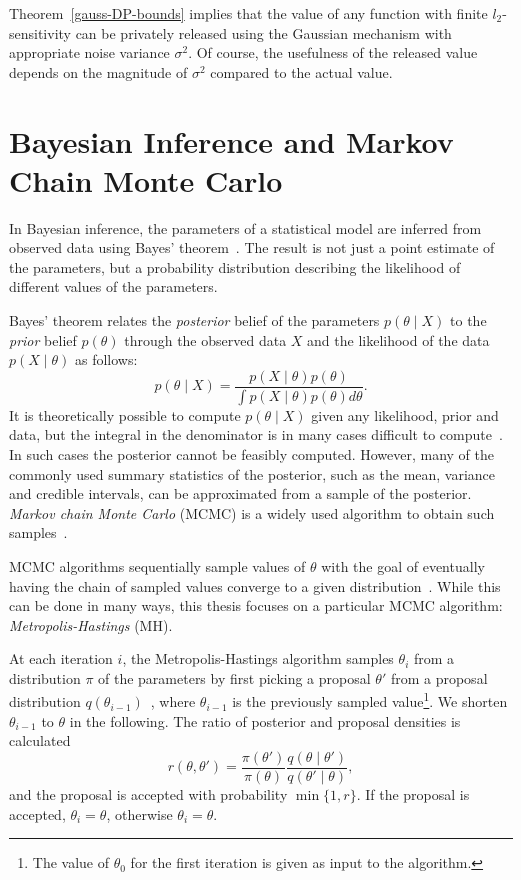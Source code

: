\documentclass[english,twoside,openright]{HYgraduMLDS}
\begin{document}
Theorem~\ref{gauss-DP-bounds} implies that the value of any function with
finite \(l_2\)-sensitivity can be privately released using the Gaussian mechanism 
with appropriate noise variance \(\sigma^2\). Of course, the usefulness of the 
released value depends on the magnitude of \(\sigma^2\) compared to the actual 
value.

\section{Bayesian Inference and Markov Chain Monte Carlo}\label{MCMC_background}

In Bayesian inference, the parameters of a statistical model are inferred from 
observed data using Bayes' theorem~\cite{BDA}. The result is not just a point estimate 
of the parameters, but a probability distribution describing the likelihood 
of different values of the parameters.

Bayes' theorem relates the \emph{posterior} belief of the parameters 
\(p(\theta \mid X)\) to the \emph{prior} belief \(p(\theta)\) through the 
observed data \(X\) and the likelihood of the data \(p(X\mid \theta)\) as follows:
\[
    p(\theta \mid X) = \frac{p(X \mid \theta)p(\theta)}
    {\int p(X\mid \theta)p(\theta)d\theta}.
\]
It is theoretically possible to compute \(p(\theta \mid X)\) given any 
likelihood, prior and data, but the integral in the denominator is in many 
cases difficult to compute~\cite{BDA}. In such cases the posterior cannot be feasibly 
computed. However, many of the commonly used summary statistics of the posterior, 
such as the mean, variance and credible intervals, can be approximated from 
a sample of the posterior. \emph{Markov chain Monte Carlo} (MCMC) is a 
widely used algorithm to obtain such samples~\cite{BDA}.

MCMC algorithms sequentially sample values of \(\theta\)
with the goal of eventually having the chain of sampled values converge to 
a given distribution~\cite{BDA}. While this can be done in many ways, this thesis 
focuses on a particular MCMC algorithm: \emph{Metropolis-Hastings} (MH).

At each iteration \(i\), the Metropolis-Hastings algorithm samples \(\theta_i\) 
from a distribution \(\pi\) of the parameters
by first picking a proposal \(\theta'\) from a proposal 
distribution \(q(\theta_{i-1})\)~\cite{BDA}, where \(\theta_{i-1}\) is the 
previously sampled value\footnote{
    The value of \(\theta_0\) for the first iteration is given as input to the 
    algorithm.
}. We shorten \(\theta_{i-1}\) to \(\theta\) in the following. 
The ratio of posterior and proposal densities is calculated
\[
    r(\theta, \theta') = \frac{\pi(\theta')}{\pi(\theta)}
    \frac{q(\theta\mid \theta')}{q(\theta'\mid \theta)},
\]
and the proposal is accepted with probability \(\min\{1, r\}\). 
If the proposal is accepted, 
\(\theta_i = \theta\), otherwise \(\theta_i = \theta\).
\end{document}
